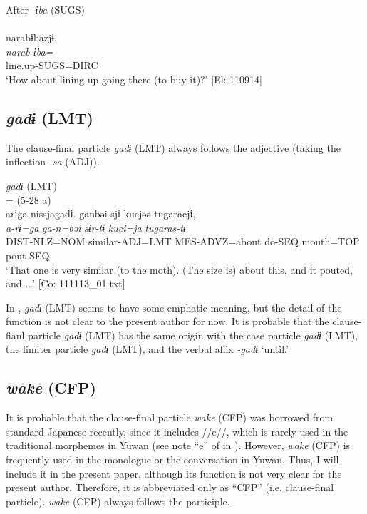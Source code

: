   \ex After \textit{{}-ɨba} (SUGS)\\\\
      \glll    narabɨbazjɨ.\\
    \textit{narab-ɨba=}\\
    line.up-SUGS=DIRC\\
    \glt     ‘How about lining up going there (to buy it)?’ [El: 110914]
    \z
\z

\subsection{\textit{gadɨ} (LMT)}\label{sec:10.3.10}

The clause-final particle \textit{gadɨ} (LMT) always follows the adjective (taking the inflection \textit{{}-sa} (ADJ)).

\ea\label{ex:10.56}   \textit{gadɨ} (LMT)\\ = (5-28 a)\\
      \glll    arɨga  nissjagadɨ.  ganbəi  sjɨ   kucjəə  tugaracjɨ,\\
    \textit{a-rɨ=ga}  \textit{}  \textit{ga-n=bəi}  \textit{sɨr-tɨ}   \textit{kuci=ja}  \textit{tugaras-tɨ}\\
    DIST-NLZ=NOM  similar-ADJ=LMT  MES-ADVZ=about  do-SEQ   mouth=TOP  pout-SEQ\\
\glt     ‘That one is very similar (to the moth). (The size is) about this, and it pouted, and ...’  [Co: 111113\_01.txt]
\z

In , \textit{gadɨ} (LMT) seems to have some emphatic meaning, but the detail of the function is not clear to the present author for now. It is probable that the clause-fianl particle \textit{gadɨ} (LMT) has the same origin with the case particle \textit{gadɨ} (LMT), the limiter particle \textit{gadɨ} (LMT), and the verbal affix \textit{{}-gadɨ} ‘until.’

\subsection{\textit{wake} (CFP)}\label{sec:10.3.11}

It is probable that the clause-final particle \textit{wake} (CFP) was borrowed from standard Japanese recently, since it includes //e//, which is rarely used in the traditional morphemes in Yuwan (see note “e” of  in ). However, \textit{wake} (CFP) is frequently used in the monologue or the conversation in Yuwan. Thus, I will include it in the present paper, although its function is not very clear for the present author. Therefore, it is abbreviated only as “CFP” (i.e. clause-final particle). \textit{wake} (CFP) always follows the participle.

